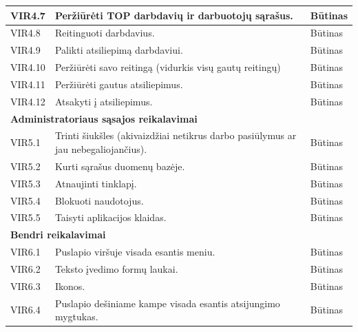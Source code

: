 \documentclass{VUMIFPSkursinis}
\begin{document}
\begin{table}[H]
\begin{tabular}{|p{2cm}|p{10cm}|p{3cm}|}
VIR4.7 & \multicolumn{1}{m{10cm}|}{Peržiūrėti TOP darbdavių ir darbuotojų sąrašus.} & Būtinas \\ \hline
VIR4.8 & \multicolumn{1}{m{10cm}|}{Reitinguoti darbdavius.} & Būtinas \\ \hline
VIR4.9 & \multicolumn{1}{m{10cm}|}{Palikti atsiliepimą darbdaviui.} & Būtinas \\ \hline
VIR4.10 & \multicolumn{1}{m{10cm}|}{Peržiūrėti savo reitingą (vidurkis visų gautų reitingų)} & Būtinas \\ \hline
VIR4.11& \multicolumn{1}{m{10cm}|}{Peržiūrėti gautus atsiliepimus.} & Būtinas \\ \hline
VIR4.12 & \multicolumn{1}{m{10cm}|}{Atsakyti į atsiliepimus.} & Būtinas \\ \hline
\multicolumn{3}{|l|}{\textbf{Administratoriaus sąsajos reikalavimai}} \\ \hline
VIR5.1 & \multicolumn{1}{m{10cm}|}{Trinti šiukšles (akivaizdžiai netikrus darbo pasiūlymus ar jau nebegaliojančius).} & Būtinas \\ \hline
VIR5.2 & \multicolumn{1}{m{10cm}|}{Kurti sąrašus duomenų bazėje.} & Būtinas \\ \hline
VIR5.3 & \multicolumn{1}{m{10cm}|}{Atnaujinti tinklapį.} & Būtinas \\ \hline
VIR5.4 & \multicolumn{1}{m{10cm}|}{Blokuoti naudotojus.} & Būtinas \\ \hline
VIR5.5 & \multicolumn{1}{m{10cm}|}{Taisyti aplikacijos klaidas.} & Būtinas \\ \hline
\multicolumn{3}{|l|}{\textbf{Bendri reikalavimai}} \\ \hline
VIR6.1 & \multicolumn{1}{m{10cm}|}{Puslapio viršuje visada esantis meniu.} & Būtinas \\ \hline
VIR6.2 & \multicolumn{1}{m{10cm}|}{Teksto įvedimo formų laukai.} & Būtinas \\ \hline
VIR6.3 & \multicolumn{1}{m{10cm}|}{Ikonos.} & Būtinas \\ \hline
VIR6.4 & \multicolumn{1}{m{10cm}|}{Puslapio dešiniame kampe visada esantis atsijungimo mygtukas.} & Būtinas \\ \hline
\end{tabular}
\end{table}
\end{document}
